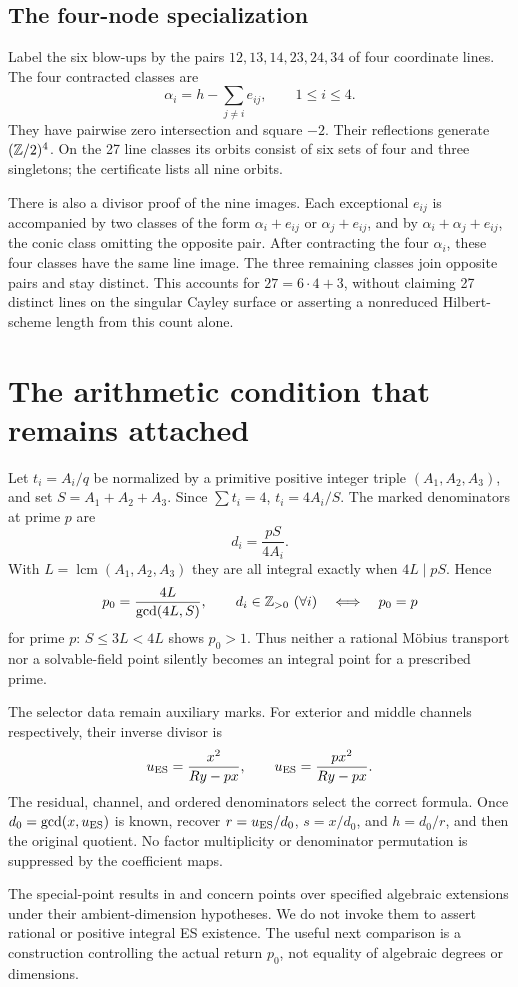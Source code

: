 \documentclass[11pt]{article}
\theoremstyle{remark}\newtheorem{remark}[theorem]{Remark}
\newcommand{\lcm}{\operatorname{lcm}}
\begin{document}
\subsection{The four-node specialization}
Label the six blow-ups by the pairs $12,13,14,23,24,34$ of four coordinate lines. The four contracted classes are
\[
 \alpha_i=h-\sum_{j\ne i}e_{ij},\qquad 1\le i\le4.
\]
They have pairwise zero intersection and square $-2$. Their reflections generate $(\mathbb Z/2)^4$. On the 27 line classes its orbits consist of six sets of four and three singletons; the certificate lists all nine orbits.

There is also a divisor proof of the nine images. Each exceptional $e_{ij}$ is accompanied by two classes of the form $\alpha_i+e_{ij}$ or $\alpha_j+e_{ij}$, and by $\alpha_i+\alpha_j+e_{ij}$, the conic class omitting the opposite pair. After contracting the four $\alpha_i$, these four classes have the same line image. The three remaining classes join opposite pairs and stay distinct. This accounts for $27=6\cdot4+3$, without claiming 27 distinct lines on the singular Cayley surface or asserting a nonreduced Hilbert-scheme length from this count alone.

\section{The arithmetic condition that remains attached}
Let $t_i=A_i/q$ be normalized by a primitive positive integer triple $(A_1,A_2,A_3)$, and set $S=A_1+A_2+A_3$. Since $\sum t_i=4$, $t_i=4A_i/S$. The marked denominators at prime $p$ are
\[
 d_i=\frac{pS}{4A_i}.
\]
With $L=\lcm(A_1,A_2,A_3)$ they are all integral exactly when $4L\mid pS$. Hence
\[
 p_0=\frac{4L}{\gcd(4L,S)},\qquad
 d_i\in\mathbb Z_{>0}\ (\forall i)\quad\Longleftrightarrow\quad p_0=p
\]
for prime $p$: $S\le3L<4L$ shows $p_0>1$. Thus neither a rational M\"obius transport nor a solvable-field point silently becomes an integral point for a prescribed prime.

The selector data remain auxiliary marks. For exterior and middle channels respectively, their inverse divisor is
\[
 u_{\rm ES}=\frac{x^2}{Ry-px},\qquad
 u_{\rm ES}=\frac{px^2}{Ry-px}.
\]
The residual, channel, and ordered denominators select the correct formula. Once $d_0=\gcd(x,u_{\rm ES})$ is known, recover $r=u_{\rm ES}/d_0$, $s=x/d_0$, and $h=d_0/r$, and then the original quotient. No factor multiplicity or denominator permutation is suppressed by the coefficient maps.

The special-point results in \citet[Theorems~1.2--1.3]{gomezwolfson} and \citet{gomez} concern points over specified algebraic extensions under their ambient-dimension hypotheses. We do not invoke them to assert rational or positive integral ES existence. The useful next comparison is a construction controlling the actual return $p_0$, not equality of algebraic degrees or dimensions.
\end{document}
